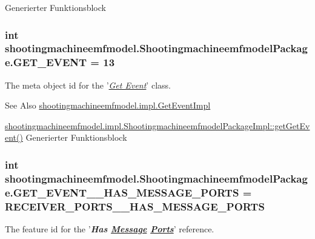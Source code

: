 Generierter Funktionsblock  \hypertarget{interfaceshootingmachineemfmodel_1_1_shootingmachineemfmodel_package_a455c42983e7a26435593b1a895505a0f}{
\subsubsection[{G\-E\-T\-\_\-\-E\-V\-E\-N\-T}]{\setlength{\rightskip}{0pt plus 5cm}int shootingmachineemfmodel.\-Shootingmachineemfmodel\-Package.\-G\-E\-T\-\_\-\-E\-V\-E\-N\-T = 13}}\label{interfaceshootingmachineemfmodel_1_1_shootingmachineemfmodel_package_a455c42983e7a26435593b1a895505a0f}
The meta object id for the '\hyperlink{classshootingmachineemfmodel_1_1impl_1_1_get_event_impl}{{\itshape Get Event}}' class.

\begin{DoxySeeAlso}{See Also}
\hyperlink{classshootingmachineemfmodel_1_1impl_1_1_get_event_impl}{shootingmachineemfmodel.\-impl.\-Get\-Event\-Impl} 

\hyperlink{classshootingmachineemfmodel_1_1impl_1_1_shootingmachineemfmodel_package_impl_afdfe7cab56afecf4b421d94f8b82aebe}{shootingmachineemfmodel.\-impl.\-Shootingmachineemfmodel\-Package\-Impl\-::get\-Get\-Event()} Generierter Funktionsblock 
\end{DoxySeeAlso}
\hypertarget{interfaceshootingmachineemfmodel_1_1_shootingmachineemfmodel_package_a4ab331e8bfd030492ae5d6194070c1d7}{
\subsubsection[{G\-E\-T\-\_\-\-E\-V\-E\-N\-T\-\_\-\-\_\-\-H\-A\-S\-\_\-\-M\-E\-S\-S\-A\-G\-E\-\_\-\-P\-O\-R\-T\-S}]{\setlength{\rightskip}{0pt plus 5cm}int shootingmachineemfmodel.\-Shootingmachineemfmodel\-Package.\-G\-E\-T\-\_\-\-E\-V\-E\-N\-T\-\_\-\-\_\-\-H\-A\-S\-\_\-\-M\-E\-S\-S\-A\-G\-E\-\_\-\-P\-O\-R\-T\-S = {\bf R\-E\-C\-E\-I\-V\-E\-R\-\_\-\-P\-O\-R\-T\-S\-\_\-\-\_\-\-H\-A\-S\-\_\-\-M\-E\-S\-S\-A\-G\-E\-\_\-\-P\-O\-R\-T\-S}}}\label{interfaceshootingmachineemfmodel_1_1_shootingmachineemfmodel_package_a4ab331e8bfd030492ae5d6194070c1d7}
The feature id for the '{\itshape {\bfseries Has \hyperlink{interfaceshootingmachineemfmodel_1_1_message}{Message} \hyperlink{interfaceshootingmachineemfmodel_1_1_ports}{Ports}}}' reference.

